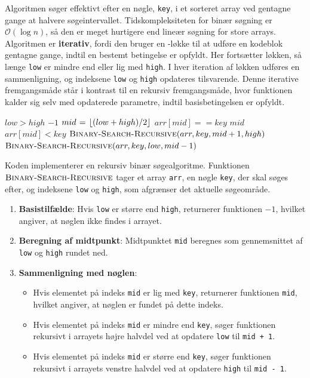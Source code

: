 Algoritmen søger effektivt efter en nøgle, \texttt{key}, i et sorteret array ved gentagne gange at halvere søgeintervallet. Tidskompleksiteten for binær søgning er \(\mathcal{O}(\log n)\), så den er meget hurtigere end lineær søgning for store arrays. Algoritmen er \textbf{iterativ}, fordi den bruger en \texttt{\While}-løkke til at udføre en kodeblok gentagne gange, indtil en bestemt betingelse er opfyldt. Her fortsætter løkken, så længe \texttt{low} er mindre end eller lig med \texttt{high}. I hver iteration af løkken udføres en sammenligning, og indeksene \texttt{low} og \texttt{high} opdateres tilsvarende. Denne iterative fremgangsmåde står i kontrast til en rekursiv fremgangsmåde, hvor funktionen kalder sig selv med opdaterede parametre, indtil basisbetingelsen er opfyldt.

\begin{codebox}
    \li \If $low > high$ \Then
    \li     \Return $-1$  \End
    \li $mid \mathrel{\hspace{1pt}=\hspace{1pt}} \left\lfloor (low + high) / 2 \right\rfloor$ 
    \li \If $arr[mid] == key$ \Then
    \li     \Return $mid$ 
    \li \ElseIf $arr[mid] < key$ \Then
    \li     {}
    \li     \Return $\proc{Binary-Search-Recursive}(arr, key, mid + 1, high)$
    \li \Else
    \li     {}
    \li     \Return $\proc{Binary-Search-Recursive}(arr, key, low, mid - 1)$ 
        \End
\end{codebox}

Koden implementerer en rekursiv binær søgealgoritme. Funktionen $\proc{Binary-Search-Recursive}$ tager et array \texttt{arr}, en nøgle \texttt{key}, der skal søges efter, og indeksene \texttt{low} og \texttt{high}, som afgrænser det aktuelle søgeområde.

\begin{enumerate}
    \item \textbf{Basistilfælde}: Hvis \texttt{low} er større end \texttt{high}, returnerer funktionen $-1$, hvilket angiver, at nøglen ikke findes i arrayet.
    \item \textbf{Beregning af midtpunkt}: Midtpunktet \texttt{mid} beregnes som gennemsnittet af \texttt{low} og \texttt{high} rundet ned.
    \item \textbf{Sammenligning med nøglen}:
    \begin{itemize}
        \item Hvis elementet på indeks \texttt{mid} er lig med \texttt{key}, returnerer funktionen \texttt{mid}, hvilket angiver, at nøglen er fundet på dette indeks.
        \item Hvis elementet på indeks \texttt{mid} er mindre end \texttt{key}, søger funktionen rekursivt i arrayets højre halvdel ved at opdatere \texttt{low} til \texttt{mid + 1}.
        \item Hvis elementet på indeks \texttt{mid} er større end \texttt{key}, søger funktionen rekursivt i arrayets venstre halvdel ved at opdatere \texttt{high} til \texttt{mid - 1}.
    \end{itemize}
\end{enumerate}

